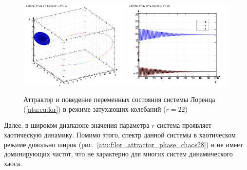 \begin{figure}[ht!]
\begin{center}
  \includegraphics[width=0.49\textwidth]{p/cha/lor/lor0-p_xyz_r=022.png}
  \hfill
  \includegraphics[width=0.49\textwidth]{p/cha/lor/lor0-p_t_r=022.png}
\end{center}
  \caption{Аттрактор и поведение переменных состояния системы Лоренца (\ref{atu:eq:lor}) в режиме затухающих колебаний ($r=22$)}
\label{atu:f:lor_attractor_fading}
\end{figure}

Далее,  в широком диапазоне значения параметра $r$
система проявляет хаотическую динамику. Помимо
этого, спектр данной системы в хаотическом режиме довольно широк
(рис.~\ref{atu:f:lor_attractor_phase_chaos28})
и не имеет доминирующих частот, что не характерно для многих систем
динамического хаоса.

